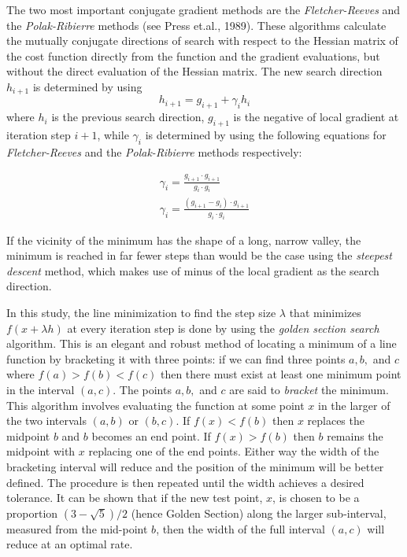 \documentclass[a4paper,12pt]{article}
\begin{document}
The two most important conjugate gradient methods are the
\emph{Fletcher-Reeves} and the \emph{Polak-Ribierre} methods (see Press
et.al., 1989). These algorithms calculate the mutually conjugate directions
of search with respect to the Hessian matrix of the cost function directly
from the function and the gradient evaluations, but without the direct
evaluation of the Hessian matrix. The new search direction $h_{i+1}$ is
determined by using
\begin{equation}
   h_{i+1} = g_{i+1}+\gamma_i h_i
\end{equation}
where $h_i$ is the previous search direction, $g_{i+1}$ is the negative of
local gradient at iteration step $i+1$, while $\gamma_i$ is determined by
using the following equations for \emph{Fletcher-Reeves} and the
\emph{Polak-Ribierre} methods respectively:

\begin{eqnarray}
   \gamma_i=\frac{g_{i+1} \cdot g_{i+1}}{g_{i} \cdot g_{i}} \\
   \gamma_i=\frac{(g_{i+1}-g_{i}) \cdot g_{i+1}}{g_{i} \cdot g_{i}}
\end{eqnarray}

If the vicinity of the minimum has the shape of a long, narrow valley, the
minimum is reached in far fewer steps than would be the case using the
\emph{steepest descent} method, which makes use of minus of the local
gradient as the search direction.

In this study, the line minimization to find the step size $\lambda$ that
minimizes $f(x+\lambda h)$ at every iteration step is done by using the
\emph{golden section search} algorithm. This is an elegant and robust
method of locating a minimum of a line function by bracketing it with three
points: if we can find three points $a,b,$ and $c$ where $f(a)>f(b)<f(c)$
then there must exist at least one minimum point in the interval $(a,c)$.
The points $a,b,$ and $c$ are said to \emph{bracket} the minimum. This
algorithm involves evaluating the function at some point $x$ in the larger
of the two intervals $(a,b)$ or $(b,c)$. If $f(x)<f(b)$ then $x$ replaces
the midpoint $b$ and $b$ becomes an end point. If $f(x)>f(b)$ then $b$
remains the midpoint with $x$ replacing one of the end points. Either way
the width of the bracketing interval will reduce and the position of the
minimum will be better defined. The procedure is then repeated until the
width achieves a desired tolerance. It can be shown that if the new test
point, $x$, is chosen to be a proportion $(3-\sqrt{5})/2$ (hence Golden
Section) along the larger sub-interval, measured from the mid-point $b$,
then the width of the full interval $(a,c)$ will reduce at an optimal rate.
\end{document}
